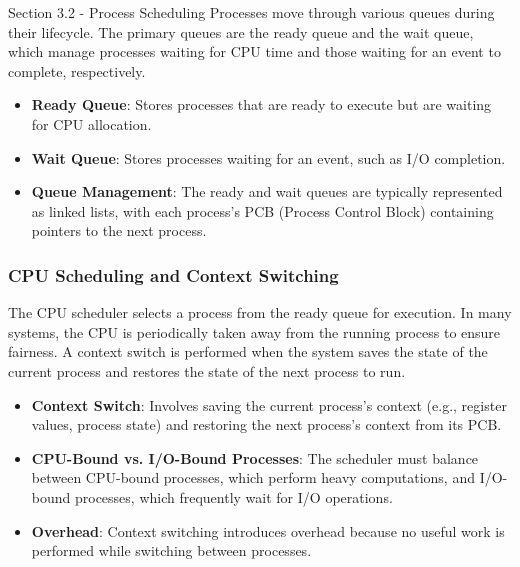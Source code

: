 \begin{notes}{Section 3.2 - Process Scheduling}
    Processes move through various queues during their lifecycle. The primary queues are the ready queue and the wait queue, which manage processes waiting for CPU time and those waiting for an event to complete, respectively.
    
    \begin{highlight}
    
        \begin{itemize}
            \item \textbf{Ready Queue}: Stores processes that are ready to execute but are waiting for CPU allocation. 
            \item \textbf{Wait Queue}: Stores processes waiting for an event, such as I/O completion.
            \item \textbf{Queue Management}: The ready and wait queues are typically represented as linked lists, with each process's PCB (Process Control Block) containing pointers to the next process.
        \end{itemize}
    
    \end{highlight}
    
    \subsubsection*{CPU Scheduling and Context Switching}
    
    The CPU scheduler selects a process from the ready queue for execution. In many systems, the CPU is periodically taken away from the running process to ensure fairness. A context switch is
    performed when the system saves the state of the current process and restores the state of the next process to run.
    
    \begin{highlight}
    
        \begin{itemize}
            \item \textbf{Context Switch}: Involves saving the current process's context (e.g., register values, process state) and restoring the next process's context from its PCB.
            \item \textbf{CPU-Bound vs. I/O-Bound Processes}: The scheduler must balance between CPU-bound processes, which perform heavy computations, and I/O-bound processes, which frequently wait for I/O operations.
            \item \textbf{Overhead}: Context switching introduces overhead because no useful work is performed while switching between processes.
        \end{itemize}
    

\end{highlight}
\end{notes}

